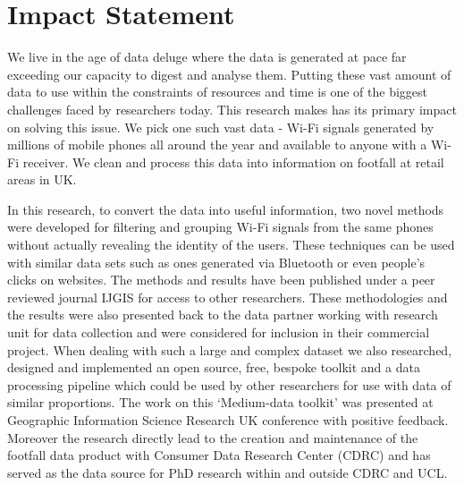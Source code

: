 \section*{Impact Statement}

We live in the age of data deluge where the data is generated at pace far exceeding our capacity to digest and analyse them.
Putting these vast amount of data to use within the constraints of resources and time is one of the biggest challenges faced by researchers today.
This research makes has its primary impact on solving this issue.
We pick one such vast data - Wi-Fi signals generated by millions of mobile phones all around the year and available to anyone with a Wi-Fi receiver.
We clean and process this data into information on footfall at retail areas in UK.

In this research, to convert the data into useful information, two novel methods were developed for filtering and grouping Wi-Fi signals from the same phones without actually revealing the identity of the users.
These techniques can be used with similar data sets such as ones generated via Bluetooth or even people's clicks on websites.
The methods and results have been published under a peer reviewed journal IJGIS for access to other researchers.
These methodologies and the results were also presented back to the data partner working with research unit for data collection and were considered for inclusion in their commercial project.
When dealing with such a large and complex dataset we also researched, designed and implemented an open source, free, bespoke toolkit and a data processing pipeline which could be used by other researchers for use with data of similar proportions.
The work on this `Medium-data toolkit' was presented at Geographic Information Science Research UK conference with positive feedback.
Moreover the research directly lead to the creation and maintenance of the footfall data product with Consumer Data Research Center (CDRC) and has served as the  data source for PhD research within and outside CDRC and UCL.


